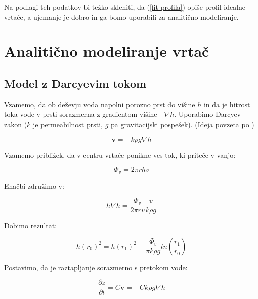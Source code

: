 \documentclass[a4paper, oneside, 12pt]{book}
\begin{document}
        Na podlagi teh podatkov bi težko skleniti, da (\ref{fit-profila}) opiše profil idealne vrtače, a ujemanje je dobro in ga bomo uporabili za analitično modeliranje. 


        \chapter{Analitično modeliranje vrtač}
        \label{analiticno-modeliranje}

        \section{Model z Darcyevim tokom}

        Vzamemo, da ob deževju voda napolni porozno prst do višine $h$ in da je hitrost toka vode v prsti sorazmerna z gradientom višine - $\nabla h$. Uporabimo Darcyev zakon ($k$ je permeabilnost prsti, $g$ pa gravitacijski pospešek). (Ideja povzeta po \cite{Kodre1994})

        \begin{equation}
          \mathbf{v} = - k \rho g \nabla h
          \label{darcyev-zakon}
        \end{equation}

        Vzamemo približek, da v centru vrtače ponikne ves tok, ki priteče v vanjo:

        \begin{equation}
          \Phi_v = 2 \pi r h v
          \label{darcy-tok}
        \end{equation}

        Enačbi združimo v:

        \begin{equation}
          h \nabla h = \frac{\Phi_v}{2 \pi r v} \frac{v}{k \rho g}
          \label{darcy-pretok-1}
        \end{equation}

        Dobimo rezultat:

        \begin{equation}
          h(r_0)^2 = h(r_1)^2 - \frac{\Phi_v}{\pi k \rho g} ln(\frac{r_1}{r_0})
          \label{darcy-gladina}
        \end{equation}

        Postavimo, da je raztapljanje sorazmerno s pretokom vode:

        \begin{equation}
          \frac{\partial z}{\partial t} = C \mathbf{v} = - C k \rho g \nabla h
          \label{darcy-raztapljanje-2}
        \end{equation}
\end{document}

